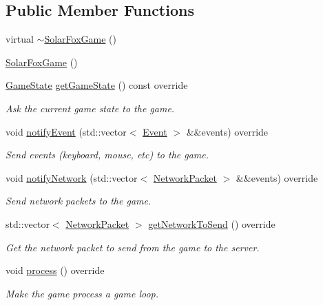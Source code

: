\subsection*{Public Member Functions}
\begin{DoxyCompactItemize}
\item 
virtual \hyperlink{classarcade_1_1_solar_fox_game_ab392eb5aaea9402b947efae9e08147dc}{$\sim$\+Solar\+Fox\+Game} ()
\item 
\hyperlink{classarcade_1_1_solar_fox_game_a8ff7ea5338af65ad2b0f6f038b89b697}{Solar\+Fox\+Game} ()
\item 
\hyperlink{namespacearcade_a6adca89ee2f539b03980c7e59b044ed7}{Game\+State} \hyperlink{classarcade_1_1_solar_fox_game_a71122936c223e672058280755f24a98a}{get\+Game\+State} () const override
\begin{DoxyCompactList}\small\item\em Ask the current game state to the game. \end{DoxyCompactList}\item 
void \hyperlink{classarcade_1_1_solar_fox_game_a12b4c225cad3913bb441a1b208c84bd7}{notify\+Event} (std\+::vector$<$ \hyperlink{structarcade_1_1_event}{Event} $>$ \&\&events) override
\begin{DoxyCompactList}\small\item\em Send events (keyboard, mouse, etc) to the game. \end{DoxyCompactList}\item 
void \hyperlink{classarcade_1_1_solar_fox_game_ada83eb3dae2a14130fca4376f9274e5a}{notify\+Network} (std\+::vector$<$ \hyperlink{structarcade_1_1_network_packet}{Network\+Packet} $>$ \&\&events) override
\begin{DoxyCompactList}\small\item\em Send network packets to the game. \end{DoxyCompactList}\item 
std\+::vector$<$ \hyperlink{structarcade_1_1_network_packet}{Network\+Packet} $>$ \hyperlink{classarcade_1_1_solar_fox_game_a54b56444f83661b4330de868024671d6}{get\+Network\+To\+Send} () override
\begin{DoxyCompactList}\small\item\em Get the network packet to send from the game to the server. \end{DoxyCompactList}\item 
void \hyperlink{classarcade_1_1_solar_fox_game_a12ff0eeb750910455e2dcc1954cdac86}{process} () override
\begin{DoxyCompactList}\small\item\em Make the game process a game loop. \end{DoxyCompactList}\item 

\end{DoxyCompactItemize}
